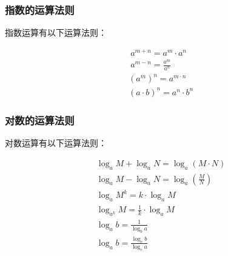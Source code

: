 \documentclass[UTF8]{ctexart}
\begin{document}
\newpage

\subsubsection{指数的运算法则}
    指数运算有以下运算法则：
    \begin{large}
        \begin{align*}
            &~a^{m+n}=a^m\cdot a^n\\[6mm]
            &~a^{m-n}=\frac{a^m}{a^n}\\[6mm]
            &\left(a^m\right)^n=a^{m\cdot n}\\[6mm]
            &\left(a\cdot b\right)^n=a^n\cdot b^n
        \end{align*}
    \end{large}

\subsubsection{对数的运算法则}
    对数运算有以下运算法则：
    \begin{large}
        \begin{align*}
            &\log_{a}M+\log_{a}N=\log_{a}(M\cdot N)\\[7mm]
            &\log_{a}M-\log_{a}N=\log_{a}(\frac{M}{N})\\[7mm]
            &\log_{a}M^{k}=k\cdot\log_{a}{M}\\[7mm]
            &\log_{a^k}M=\frac{1}{k}\cdot\log_{a}{M}\\[7mm]
            &\log_{a}{b}=\frac{1}{\log_{b}{a}}\\[7mm]
            &\log_{a}{b}=\frac{\log_{c}{b}}{\log_{c}{a}}
        \end{align*}
    \end{large}
    
\newpage
\end{document}
